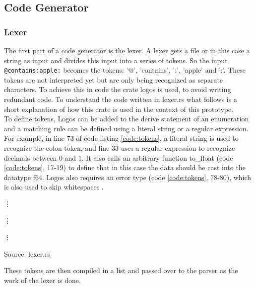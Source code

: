\subsection{Code Generator}
\subsubsection{Lexer}
The first part of a code generator is the lexer. A lexer gets a file or in this case a string as input and divides this input into a series of tokens. So the input \lstinline[language=Fulltext-Search]$@contains:apple:$ becomes the tokens: '@', 'contains', ':', 'apple' and ':'. These tokens are not interpreted yet but are only being recognized as separate characters. To achieve this in code the crate logos is used, to avoid writing redundant code. To understand the code written in lexer.rs what follows is a short explanation of how this crate is used in the context of this prototype.\\
To define tokens, Logos can be added to the derive statement of an enumeration and a matching rule can be defined using a literal string or a regular expression. For example, in line 73 of code listing \ref{code:tokens}, a literal string is used to recognize the colon token, and line 33 uses a regular expression to recognize decimals between 0 and 1. It also calls an arbitrary function to\_float (code \ref{code:tokens}, 17-19) to define that in this case the data should be cast into the datatype f64. Logos also requires an error type (code \ref{code:tokens}, 78-80), which is also used to skip whitespaces \parencite[cf.][n.p.]{hirsz_logos_2022}.
\begin{codeenv}
    \label{code:tokens}
    
    \vdots
    
    \vdots
    
    \vdots
    
    \centerline{Source: lexer.rs}
\end{codeenv}
These tokens are then compiled in a list and passed over to the parser as the work of the lexer is done.
